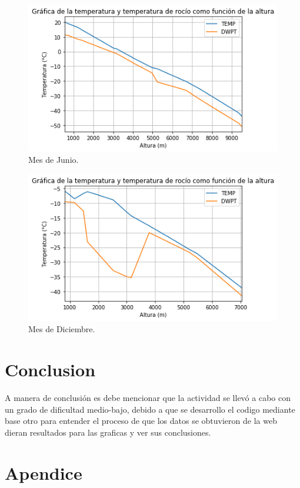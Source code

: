 \documentclass{article}
\begin{document}
\begin{figure}
  \includegraphics[width=\linewidth]{roctemp.png}
  \caption{Mes de Junio.}
\end{figure}

\begin{figure}
  \includegraphics[width=\linewidth]{roctempdic.png}
  \caption{Mes de Diciembre.}
\end{figure}

\section{Conclusion}
A manera de conclusión es debe mencionar que la actividad se llevó a cabo con un grado de dificultad medio-bajo, debido a que se desarrollo el codigo mediante base otro para entender el proceso de que los datos se obtuvieron de la web dieran resultados para las graficas y ver sus conclusiones.

\section{Apendice}
\end{document}
